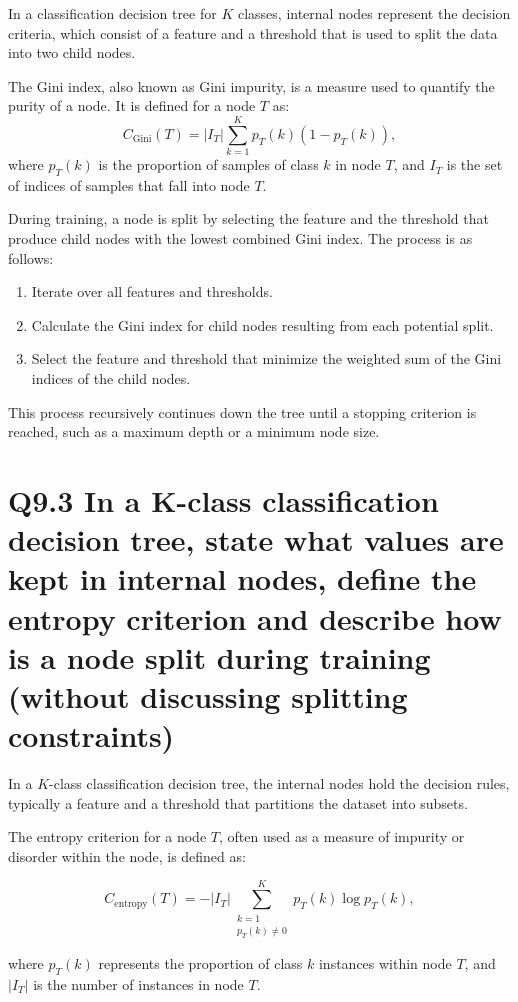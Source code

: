 \documentclass[11pt]{article}
\begin{document}
In a classification decision tree for \( K \) classes, internal nodes represent the decision criteria, which consist of a feature and a threshold that is used to split the data into two child nodes.

The Gini index, also known as Gini impurity, is a measure used to quantify the purity of a node. It is defined for a node \( T \) as:
\[
C_{\text{Gini}}(T) = |I_T| \sum_{k=1}^K p_T(k) (1 - p_T(k)),
\]
where \( p_T(k) \) is the proportion of samples of class \( k \) in node \( T \), and \( I_T \) is the set of indices of samples that fall into node \( T \).

During training, a node is split by selecting the feature and the threshold that produce child nodes with the lowest combined Gini index. The process is as follows:
\begin{enumerate}
    \item Iterate over all features and thresholds.
    \item Calculate the Gini index for child nodes resulting from each potential split.
    \item Select the feature and threshold that minimize the weighted sum of the Gini indices of the child nodes.
\end{enumerate}
This process recursively continues down the tree until a stopping criterion is reached, such as a maximum depth or a minimum node size.

\section{Q9.3 In a K-class classification decision tree, state what values are kept in internal nodes, define the entropy criterion and describe how is a node split during training (without discussing splitting constraints)}


In a \( K \)-class classification decision tree, the internal nodes hold the decision rules, typically a feature and a threshold that partitions the dataset into subsets.

The entropy criterion for a node \( T \), often used as a measure of impurity or disorder within the node, is defined as:

\[
C_{\text{entropy}}(T) = -|I_T| \sum_{\substack{k=1 \\ p_T(k) \neq 0}}^K p_T(k) \log p_T(k),
\]

where \( p_T(k) \) represents the proportion of class \( k \) instances within node \( T \), and \( |I_T| \) is the number of instances in node \( T \).
\end{document}
